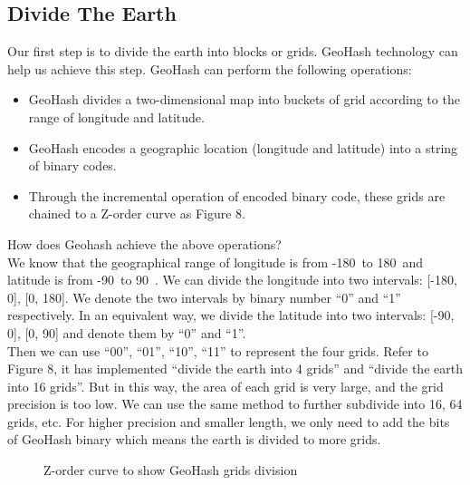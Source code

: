 \documentclass[sigplan,screen]{acmart}
\begin{document}
\subsection{Divide The Earth}
Our first step is to divide the earth into blocks or grids. GeoHash technology can help us achieve this step.
GeoHash can perform the following operations:
\begin{itemize}
	\item GeoHash divides a two-dimensional map into buckets of grid according to the range of longitude and latitude.
	\item GeoHash encodes a geographic location (longitude and latitude) into a string of binary codes.
	\item Through the incremental operation of encoded binary code, these grids are chained to a Z-order curve as Figure 8.
\end{itemize}
How does Geohash achieve the above operations?
\\
We know that the geographical range of longitude is from -180\degree\ to 180\degree\ and latitude is from -90\degree\ to 90\degree\ \cite{crossley1999guide}.
We can divide the longitude into two intervals: [-180\degree, 0\degree], [0\degree, 180\degree].
We denote the two intervals by binary number ``0'' and ``1'' respectively.
In an equivalent way, we divide the latitude into two intervals: [-90\degree, 0\degree], [0\degree, 90\degree] and denote them by ``0'' and ``1''.
\\
Then we can use ``00'', ``01'', ``10'', ``11'' to represent the four grids.
Refer to Figure 8, it has implemented ``divide the earth into 4 grids'' and ``divide the earth into 16 grids''.
But in this way, the area of each grid is very large, and the grid precision is too low.
We can use the same method to further subdivide into 16, 64 grids, etc.
For higher precision and smaller length, we only need to add the bits of GeoHash binary which means the earth is divided to more grids.
\begin{figure}[htb]
	\centering
	\caption{Z-order curve to show GeoHash grids division}
\end{figure}
\end{document}
